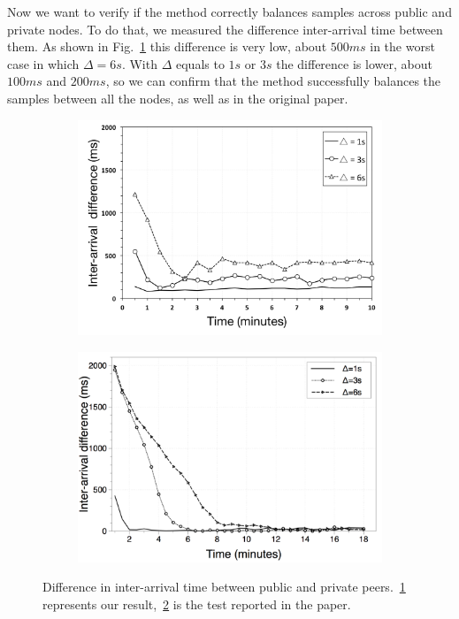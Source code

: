 Now we want to verify if the \acceptAd method correctly balances samples across public and private nodes. To do that, we measured the difference inter-arrival time between them. As shown in Fig.~\ref{fig:interarrivaltime_difference} this difference is very low, about $500ms$ in the worst case in which $\Delta = 6 s$. With $\Delta$ equals to $1s$ or $3s$ the difference is lower, about $100ms$ and $200ms$, so we can confirm that the \acceptAd method successfully balances the samples between all the nodes, as well as in the original paper.

\begin{figure}
\centering
\begin{subfigure}{.5\textwidth}
  \centering
  \includegraphics[keepaspectratio=true, width=1\linewidth]{images/interarrivaltime_difference}
  \caption{}
  \label{fig:interarrivaltime_difference}
\end{subfigure}%
\begin{subfigure}{.5\textwidth}
  \centering
  \includegraphics[keepaspectratio=true, width=1\linewidth]{images/paper_interarrivaltime_difference}
  \caption{}
  \label{fig:paper_interarrivaltime_difference}
\end{subfigure}
\caption{Difference in inter-arrival time between public and private peers.~\ref{fig:interarrivaltime_difference} represents our result,~\ref{fig:paper_interarrivaltime_difference} is the test reported in the paper.}
\label{fig:ad_interarrivaltime_difference}
\end{figure}


